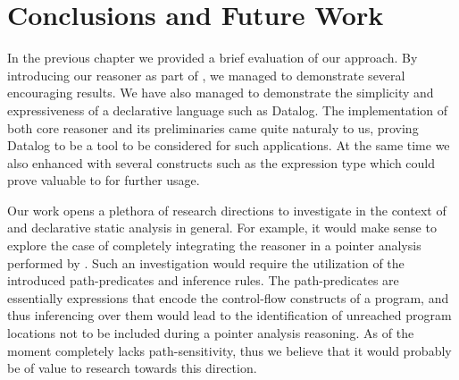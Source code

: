 \chapter{Conclusions and Future Work}\label{c:conclusions}

In the previous chapter we provided a brief evaluation of our
approach. By introducing our reasoner as part of \doop{}, we
managed to demonstrate several encouraging results. We have also
managed to demonstrate the simplicity and expressiveness of
a declarative language such as Datalog. The implementation
of both core reasoner and its preliminaries came quite naturaly
to us, proving Datalog to be a tool to be considered for such
applications. At the same time we also enhanced \doop{} with
several constructs such as the expression type which could
prove valuable to \doop{} for further usage.

Our work opens a plethora of research directions to investigate
in the context of \doop{} and declarative static analysis in
general. For example, it would make sense to explore the case
of completely integrating the reasoner in a pointer analysis
performed by \doop{}. Such an investigation would require the
utilization of the introduced path-predicates and inference
rules. The path-predicates are essentially expressions that
encode the control-flow constructs of a program, and thus
inferencing over them would lead to the identification of
unreached program locations not to be included during a
pointer analysis reasoning. As of the moment \doop{} completely
lacks path-sensitivity, thus we believe that it would probably
be of value to research towards this direction.

